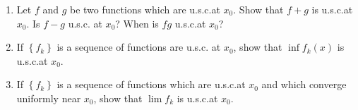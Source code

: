 \begin{problem}
  \hfill
  \begin{enumerate}[label=(\alph*)]
  \item Let \(f\) and \(g\) be two functions which are u.s.c.\@ at
    \(x_0\). Show that \(f+g\) is u.s.c.\@ at \(x_0\). Is \(f-g\) u.s.c.\@
    at \(x_0\)? When is \(fg\) u.s.c.\@ at \(x_0\)?
  \item If \(\left\{f_k\right\}\) is a sequence of functions are u.s.c.\@
    at \(x_0\), show that \(\inf f_k(x)\) is u.s.c.\@ at \(x_0\).
  \item If \(\left\{f_k\right\}\) is a sequence of functions which are
    u.s.c.\@ at \(x_0\) and which converge uniformly near \(x_0\), show
    that \(\lim f_k\) is u.s.c.\@ at \(x_0\).
  \end{enumerate}
\end{problem}

